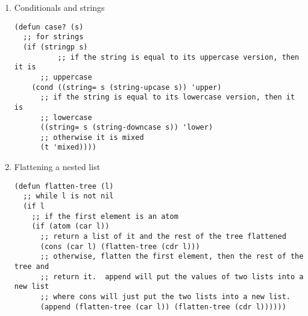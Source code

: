 \documentclass{article}
\begin{document}
\begin{enumerate}
\begin{enumerate}
\begin{enumerate}
\item
\begin{lstlisting}
(defun posint-loop (l)
  ;; for lists
  (if (listp l)
    ;; initialize an empty list of positive integers
    (let ((posints nil))
      ;; loop through each element in the list
      (loop for i in l do
		  ;; if the element is another list
	    (cond ((listp i)
		   ;; call posint-mapcar on the list
		   ;; and append it to the list of positive integers
		   (setf posints (append posints (posint-loop i))))
		  ;; if the element is a positive integer
		  ((and (integerp i) (> i 0))
		   ;; just append it to the list of positive integers
		   (setf posints (append posints (cons i '()))))))
      ;; and return the list of positive integers
      posints)))
\end{lstlisting}

\item
\begin{lstlisting}
(defun posint-recursive (l)
  ;; while l is not nil
  (if l
    (let ((a (car l)))
      (cond
	;; if the car of the list is a list
	((listp a)
	 ;; return a list of positive integers in this list and the rest of the
	 ;; elements
	 (append (posint-recursive a) (posint-recursive (cdr l))))
	;; if the element is a positive integer
	((and (integerp a) (> a 0))
	 ;; return a list of it and add the rest of the positive integers
	 (append (cons a '()) (posint-recursive (cdr l))))
	;; if its neither a list nor a positive integer, we still want to 
	;; process the rest of the list
	(t
	  (posint-recursive (cdr l)))))))
	\end{lstlisting}
\end{enumerate}
\end{enumerate}

\item Conditionals and strings
\begin{lstlisting}
(defun case? (s)
  ;; for strings
  (if (stringp s)
    	  ;; if the string is equal to its uppercase version, then it is
	  ;; uppercase
    (cond ((string= s (string-upcase s)) 'upper)
	  ;; if the string is equal to its lowercase version, then it is
	  ;; lowercase
	  ((string= s (string-downcase s)) 'lower)
	  ;; otherwise it is mixed
	  (t 'mixed))))
\end{lstlisting}

\item Flattening a nested list
\begin{lstlisting}
(defun flatten-tree (l)
  ;; while l is not nil
  (if l
    ;; if the first element is an atom
    (if (atom (car l))
      ;; return a list of it and the rest of the tree flattened
      (cons (car l) (flatten-tree (cdr l)))
      ;; otherwise, flatten the first element, then the rest of the tree and
      ;; return it.  append will put the values of two lists into a new list
      ;; where cons will just put the two lists into a new list.
      (append (flatten-tree (car l)) (flatten-tree (cdr l))))))
\end{lstlisting}
\end{enumerate}
\end{document}
